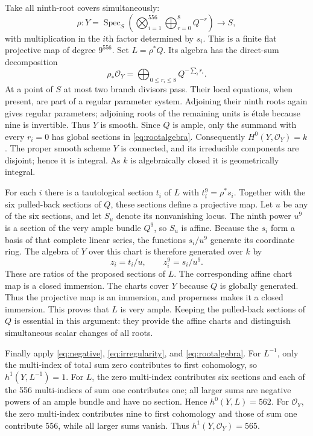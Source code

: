 \documentclass[11pt]{article}
\theoremstyle{remark}\newtheorem{remark}[theorem]{Remark}
\newcommand{\OO}{\mathcal O}
\newcommand{\Spec}{\operatorname{Spec}}
\begin{document}
Take all ninth-root covers simultaneously:
\[
 \rho:Y=\Spec_S\left(\bigotimes_{i=1}^{556}
      \bigoplus_{r=0}^8Q^{-r}\right)\longrightarrow S,
\]
with multiplication in the $i$th factor determined by $s_i$. This is a finite flat projective map of degree $9^{556}$. Set $L=\rho^*Q$. Its algebra has the direct-sum decomposition
\begin{equation}\label{eq:rootalgebra}
 \rho_*\OO_Y=\bigoplus_{0\leq r_i\leq8}Q^{-\sum_i r_i}.
\end{equation}
At a point of $S$ at most two branch divisors pass. Their local equations, when present, are part of a regular parameter system. Adjoining their ninth roots again gives regular parameters; adjoining roots of the remaining units is \'etale because nine is invertible. Thus $Y$ is smooth. Since $Q$ is ample, only the summand with every $r_i=0$ has global sections in \eqref{eq:rootalgebra}. Consequently $H^0(Y,\OO_Y)=k$. The proper smooth scheme $Y$ is connected, and its irreducible components are disjoint; hence it is integral. As $k$ is algebraically closed it is geometrically integral.

For each $i$ there is a tautological section $t_i$ of $L$ with $t_i^9=\rho^*s_i$. Together with the six pulled-back sections of $Q$, these sections define a projective map. Let $u$ be any of the six sections, and let $S_u$ denote its nonvanishing locus. The ninth power $u^9$ is a section of the very ample bundle $Q^9$, so $S_u$ is affine. Because the $s_i$ form a basis of that complete linear series, the functions $s_i/u^9$ generate its coordinate ring. The algebra of $Y$ over this chart is therefore generated over $k$ by
\[
 z_i=t_i/u,\qquad z_i^9=s_i/u^9.
\]
These are ratios of the proposed sections of $L$. The corresponding affine chart map is a closed immersion. The charts cover $Y$ because $Q$ is globally generated. Thus the projective map is an immersion, and properness makes it a closed immersion. This proves that $L$ is very ample. Keeping the pulled-back sections of $Q$ is essential in this argument: they provide the affine charts and distinguish simultaneous scalar changes of all roots.

Finally apply \eqref{eq:negative}, \eqref{eq:irregularity}, and \eqref{eq:rootalgebra}. For $L^{-1}$, only the multi-index of total sum zero contributes to first cohomology, so $h^1(Y,L^{-1})=1$. For $L$, the zero multi-index contributes six sections and each of the 556 multi-indices of sum one contributes one; all larger sums are negative powers of an ample bundle and have no section. Hence $h^0(Y,L)=562$. For $\OO_Y$, the zero multi-index contributes nine to first cohomology and those of sum one contribute 556, while all larger sums vanish. Thus $h^1(Y,\OO_Y)=565$.
\end{document}
